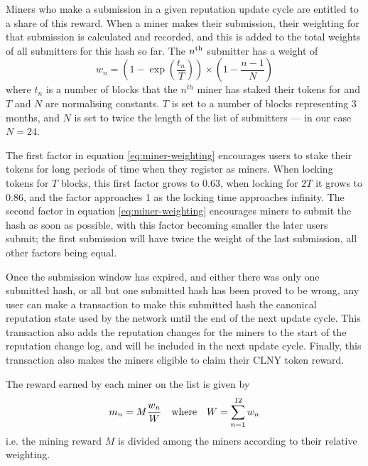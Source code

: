 Miners who make a submission in a given reputation update cycle are entitled to a share of this reward. When a miner makes their submission, their weighting for that submission is calculated and recorded, and this is added to the total weights of all submitters for this hash so far. The $n^{\rm th}$ submitter has a weight of
\begin{equation}\label{eq:miner-weighting}
 w_n = \left(1 - \exp\left(\frac{t_n}{T}\right)\right) \times \left( 1 - \frac{n-1}{N} \right)
\end{equation}
where $t_n$ is a number of blocks that the $n^{th}$ miner has staked their tokens for and $T$ and $N$ are normalising constants. $T$ is set to a number of blocks representing 3 months, and $N$ is set to twice the length of the list of submitters --- in our case $N=24$.

The first factor in equation \eqref{eq:miner-weighting} encourages users to stake their tokens for long periods of time when they register as miners. When locking tokens for $T$ blocks, this first factor grows to 0.63, when locking for $2T$ it grows to 0.86, and the factor approaches 1 as the locking time approaches infinity. The second factor in equation \eqref{eq:miner-weighting} encourages miners to submit the hash as soon as possible, with this factor becoming smaller the later users submit; the first submission will have twice the weight of the last submission, all other factors being equal.

Once the submission window has expired, and either there was only one submitted hash, or all but one submitted hash has been proved to be wrong, any user can make a transaction to make this submitted hash the canonical reputation state used by the network until the end of the next update cycle. This transaction also adds the reputation changes for the miners to the start of the reputation change log, and will be included in the next update cycle. Finally, this transaction also makes the miners eligible to claim their CLNY token reward.

The reward earned by each miner on the list is given by
\begin{equation}\label{eq:miner-payout}
 m_n = M \frac{w_n}{W} \quad \textnormal{where} \quad W = \sum_{n=1}^{12} w_n
\end{equation}
i.e. the mining reward $M$ is divided among the miners according to their relative weighting. 


